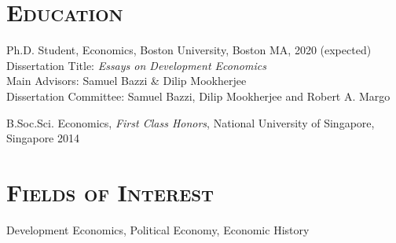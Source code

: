\documentclass[11pt,overlapped,line,letterpaper]{res}
\newenvironment{list1}{
  \begin{list}{\ding{113}}{%
      \setlength{\itemsep}{0in} \setlength{\itemindent}{-1.6em}
      \setlength{\parsep}{0in} \setlength{\parskip}{0in}
      \setlength{\topsep}{0in} \setlength{\partopsep}{0in}
      \setlength{\leftmargin}{0.5in}}}{\end{list}}
\begin{document}
\thispagestyle{empty}
\begin{resume}

\section{\textbf{\textsc{Education}}}
\begin{list1}
\item[] Ph.D. Student, Economics, Boston University, Boston MA, 2020 (expected) \\
Dissertation Title: {\it Essays on Development Economics} \\
Main Advisors: Samuel Bazzi \& Dilip Mookherjee \\
Dissertation Committee: Samuel Bazzi, Dilip Mookherjee and Robert A. Margo
\vspace{7pt}
\item[] B.Soc.Sci. Economics, \emph{First Class Honors}, National University of Singapore, Singapore 2014
\end{list1}
\vspace{-4.5pt}

\section{\textbf{\textsc{Fields of Interest}}}
\begin{list1}
\item[] Development Economics, Political Economy, Economic History
\end{list1}
\vspace{-4.5pt}



\end{resume}
\end{document}
